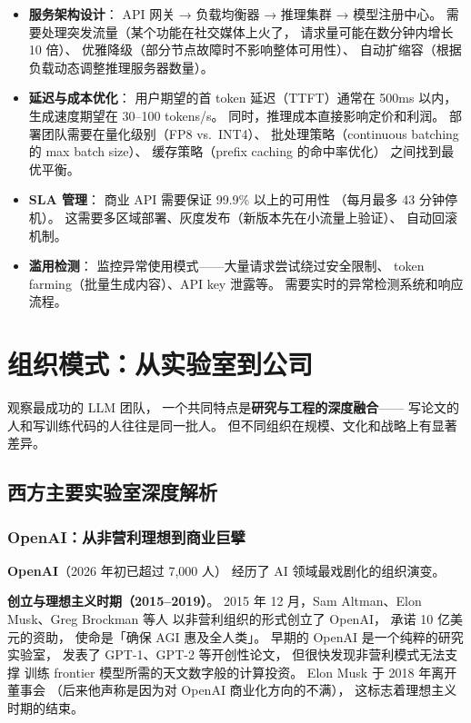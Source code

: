 \begin{itemize}[noitemsep]
  \item \textbf{服务架构设计}：
        API 网关 → 负载均衡器 → 推理集群 → 模型注册中心。
        需要处理突发流量（某个功能在社交媒体上火了，
        请求量可能在数分钟内增长 10 倍）、
        优雅降级（部分节点故障时不影响整体可用性）、
        自动扩缩容（根据负载动态调整推理服务器数量）。
  \item \textbf{延迟与成本优化}：
        用户期望的首 token 延迟（TTFT）通常在 500ms 以内，
        生成速度期望在 30--100 tokens/s。
        同时，推理成本直接影响定价和利润。
        部署团队需要在量化级别（FP8 vs.\ INT4）、
        批处理策略（continuous batching 的 max batch size）、
        缓存策略（prefix caching 的命中率优化）
        之间找到最优平衡。
  \item \textbf{SLA 管理}：
        商业 API 需要保证 99.9\% 以上的可用性
        （每月最多 43 分钟停机）。
        这需要多区域部署、灰度发布（新版本先在小流量上验证）、
        自动回滚机制。
  \item \textbf{滥用检测}：
        监控异常使用模式——大量请求尝试绕过安全限制、
        token farming（批量生成内容）、API key 泄露等。
        需要实时的异常检测系统和响应流程。
\end{itemize}

\section{组织模式：从实验室到公司}

观察最成功的 LLM 团队，
一个共同特点是\textbf{研究与工程的深度融合}——
写论文的人和写训练代码的人往往是同一批人。
但不同组织在规模、文化和战略上有显著差异。

\subsection{西方主要实验室深度解析}
\label{sec:org-labs}

\subsubsection{OpenAI：从非营利理想到商业巨擘}

\textbf{OpenAI}（2026 年初已超过 7,000 人）
经历了 AI 领域最戏剧化的组织演变。

\textbf{创立与理想主义时期（2015--2019）}。
2015 年 12 月，Sam Altman、Elon Musk、Greg Brockman 等人
以非营利组织的形式创立了 OpenAI，
承诺 10 亿美元的资助，
使命是「确保 AGI 惠及全人类」。
早期的 OpenAI 是一个纯粹的研究实验室，
发表了 GPT-1、GPT-2 等开创性论文，
但很快发现非营利模式无法支撑
训练 frontier 模型所需的天文数字般的计算投资。
Elon Musk 于 2018 年离开董事会
（后来他声称是因为对 OpenAI 商业化方向的不满），
这标志着理想主义时期的结束。

